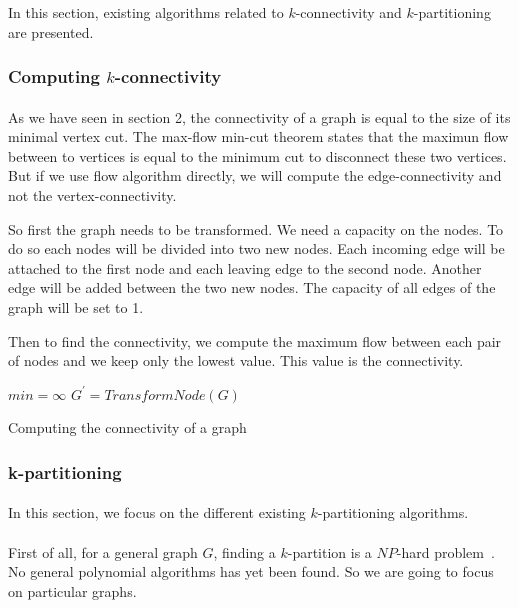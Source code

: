 In this section, existing algorithms related to
$k$-connectivity and $k$-partitioning are presented.

\subsubsection{Computing $k$-connectivity}
\paragraph{}
As we have seen in section 2, the connectivity of a graph is equal to
the size of its minimal vertex cut. The max-flow min-cut theorem states
that the maximun flow between to vertices is equal to the minimum cut to 
disconnect these two vertices. But if we use flow algorithm directly, 
we will compute the edge-connectivity and not the vertex-connectivity.

So first the graph needs to be transformed. We need a capacity on the nodes.
To do so each nodes will be divided into two new nodes. Each incoming edge will
be attached to the first node and each leaving edge to the second node. Another
edge will be added between the two new nodes.
The capacity of all edges of the graph will be set to 1.

Then to find the connectivity, we compute the maximum flow between each pair of
nodes and we keep only the lowest value. This value is the connectivity.


\begin{algorithm}[!h]
    $min = \infty$\;
    $G^{'} = TransformNode(G)$\;
    \;
    \caption{Computing the connectivity of a graph}
\end{algorithm}

\subsubsection{k-partitioning}
\paragraph{}
In this section, we focus on the different existing
$k$-partitioning algorithms.

\paragraph{}
First of all, for a general graph $G$, finding a $k$-partition is a $NP$-hard
problem~\cite{Dyer1985139}. No general polynomial algorithms has yet been found.
So we are going to focus on particular graphs.

